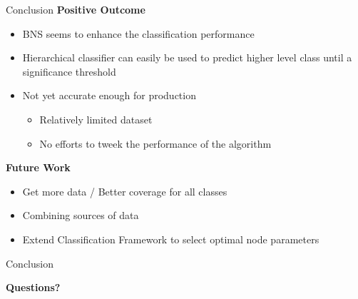 
\begin{frame}[label=conclusion]{Conclusion}
	\textbf{Positive Outcome}
	
	\begin{itemize}
	\item BNS seems to enhance the classification performance
	\item Hierarchical classifier can easily be used to predict higher level class until a significance threshold
	\item Not yet accurate enough for production
	\begin{itemize}
		\item Relatively limited dataset
		\item No efforts to tweek the performance of the algorithm
	\end{itemize}
\end{itemize}
		
	\textbf{Future Work}
	
	\begin{itemize}
		
		\item Get more data / Better coverage for all classes
		\item Combining sources of data
		\item Extend Classification Framework to select optimal node parameters
		
	\end{itemize}
	
\end{frame}


\begin{frame}[label=conclusion]{Conclusion}
\vfill
\begin{centering}
\large\textbf{Questions?}\\

\end{centering}
\end{frame}
